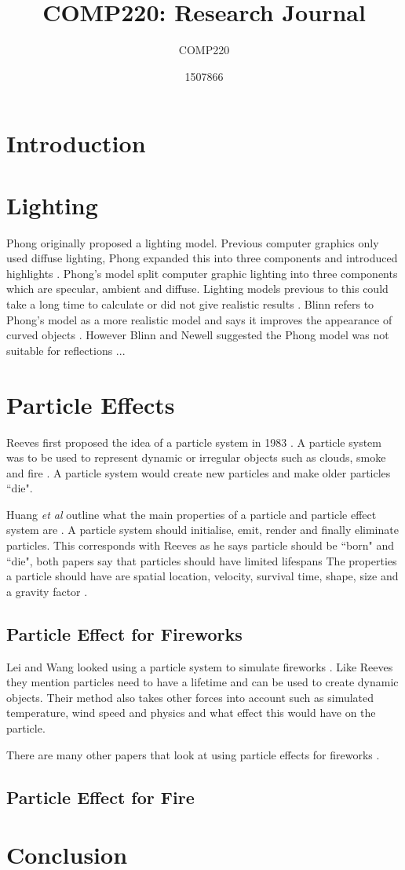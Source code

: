 \documentclass{scrartcl}
\title{COMP220: Research Journal}
\subtitle{COMP220}
\author{1507866}
\begin{document}
	
\maketitle

	
\section{Introduction}


\section{Lighting}
Phong originally proposed a lighting model.  Previous computer graphics only used diffuse lighting, Phong expanded this into three components and introduced highlights \cite{Kajiya}. Phong's model split computer graphic lighting into three components which are specular, ambient and diffuse. Lighting models previous to this could take a long time to calculate or did not give realistic results \cite{Phong}.
Blinn refers to Phong's model as a more realistic model and says it improves the appearance of curved objects \cite{Blinn}. However Blinn and Newell suggested the Phong model was not suitable for reflections \cite{BlinnNewell}...

	
\section{Particle Effects}
Reeves first proposed the idea of a particle system in 1983 \cite{Reeves}. A particle system was to be used to represent dynamic or irregular objects such as clouds, smoke and fire \cite{Reeves, Lei}. A particle system would create new particles and make older particles ``die".

Huang \textit{et al} outline what the main properties of a particle and particle effect system are \cite{Huang}.
A particle system should initialise, emit, render and finally eliminate particles. This corresponds with Reeves as he says particle should be ``born" and ``die", both papers say that particles should have limited lifespans
The properties a particle should have are spatial location, velocity, survival  time, shape, size and a gravity factor \cite{Huang}.

\subsection{Particle Effect for Fireworks}
Lei and Wang looked using a particle system to simulate fireworks \cite{Lei}. Like Reeves they mention particles need to have a lifetime and can be used to create dynamic objects. Their method also takes other forces into account such as simulated temperature, wind speed and physics and what effect this would have on the particle\cite{Lei}.

There are many other papers that look at using particle effects for fireworks \cite{Dong, Zhang}.

\subsection{Particle Effect for Fire}
\section{Conclusion}

	


	
\end{document}
